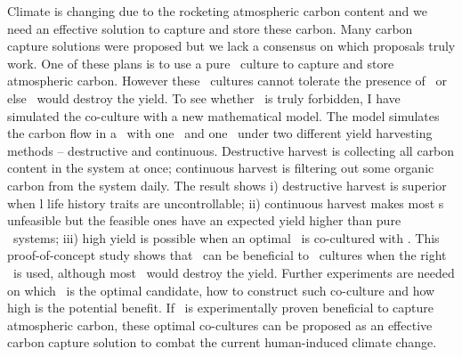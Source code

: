 \documentclass[../thesis.tex]{subfiles} %
\begin{document}
Climate is changing due to the rocketing atmospheric carbon content and we need an effective solution to capture and store these carbon.  Many carbon capture solutions were proposed but we lack a consensus on which proposals truly work.  One of these plans is to use a pure \phy\ culture to capture and store atmospheric carbon.  However these \phy\ cultures cannot tolerate the presence of \bac\ or else \bac\ would destroy the yield.  To see whether \bac\ is truly forbidden, I have simulated the co-culture with a new mathematical model.  The model simulates the carbon flow in a \pbs\ with one \phy\ and one \bac\ under two different yield harvesting methods -- destructive and continuous.  Destructive harvest is collecting all carbon content in the system at once; continuous harvest is filtering out some organic carbon from the system daily.  The result shows \Rn{1}) destructive harvest is superior when \bac l life history traits are uncontrollable; \Rn{2}) continuous harvest makes most \pbs s unfeasible but the feasible ones have an expected yield higher than pure \phy\ systems; \Rn{3}) high yield is possible when an optimal \bac\ is co-cultured with \phy.  This proof-of-concept study shows that \bac\ can be beneficial to \phy\ cultures when the right \bac\ is used, although most \bac\ would destroy the yield.  Further experiments are needed on which \bac\ is the optimal candidate, how to construct such co-culture and how high is the potential benefit.  If \bac\ is experimentally proven beneficial to capture atmospheric carbon, these optimal co-cultures can be proposed as an effective carbon capture solution to combat the current human-induced climate change.
\end{document}
